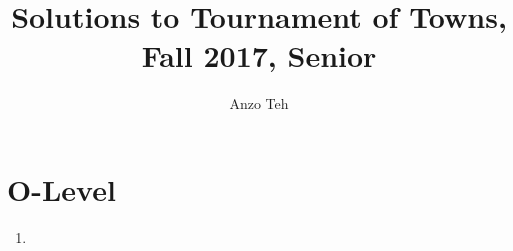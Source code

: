 \documentclass[11pt,a4paper]{article}
\begin{document}
\newcommand{\la}{\leftarrow}
\newcommand{\lra}{\leftrightarrow}
\newcommand{\bbN}{\mathbb{N}}
\newcommand{\bbZ}{\mathbb{Z}}
\newcommand{\dsum}{\displaystyle\sum}
\newcommand{\dprod}{\displaystyle\prod}


\title{Solutions to Tournament of Towns, Fall 2017, Senior}
\author{Anzo Teh}
\date{}
\maketitle

\section*{O-Level}
\begin{enumerate}
	\item
\end{enumerate}
\end{document}
